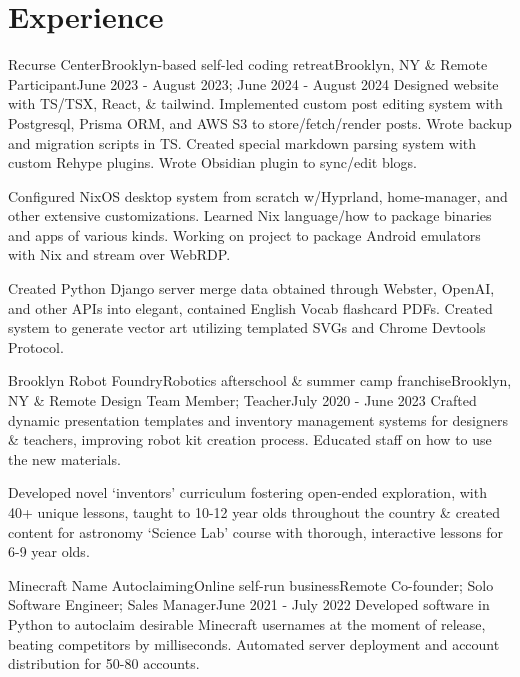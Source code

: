 \documentclass[letterpaper, 10pt]{article}
\begin{document}
\section{Experience}
\resumeSubHeadingListStart

\resumeSubheading
{Recurse Center}{Brooklyn-based self-led coding retreat}{Brooklyn, NY \& Remote}
{Participant}{June 2023 - August 2023; June 2024 - August 2024}{}
\resumeItemListStart
{}
{Designed website with TS/TSX, React, \& tailwind. Implemented custom post editing system with Postgresql, Prisma ORM, and AWS S3 to store/fetch/render posts. Wrote backup and migration scripts in TS. Created special markdown parsing system with custom Rehype plugins. Wrote Obsidian plugin to sync/edit blogs.}

{Configured NixOS desktop system from scratch w/Hyprland, home-manager, and other extensive customizations. Learned Nix language/how to package binaries and apps of various kinds. Working on project to package Android emulators with Nix and stream over WebRDP.}

{Created Python Django server merge data obtained through Webster, OpenAI, and other APIs into elegant, contained English Vocab flashcard PDFs. Created system to generate vector art utilizing templated SVGs and Chrome Devtools Protocol.}
\resumeItemListEnd

\resumeSubheading
{Brooklyn Robot Foundry}{Robotics afterschool \& summer camp franchise}{Brooklyn, NY \& Remote}
{Design Team Member; Teacher}{July 2020 - June 2023}{}
\resumeItemListStart
{}
{Crafted dynamic presentation templates and inventory management systems for designers \& teachers, improving robot kit creation process. Educated staff on how to use the new materials.}

{Developed novel `inventors' curriculum fostering open-ended exploration, with 40+ unique lessons, taught to 10-12 year olds throughout the country \& created content for astronomy `Science Lab' course with thorough, interactive lessons for 6-9 year olds.}

\resumeItemListEnd

\resumeSubheading
{Minecraft Name Autoclaiming}{Online self-run business}{Remote}
{Co-founder; Solo Software Engineer; Sales Manager}{June 2021 - July 2022}{}
\resumeItemListStart
{}
{Developed software in Python to autoclaim desirable Minecraft usernames at the moment of release, beating competitors by milliseconds. Automated server deployment and account distribution for 50-80 accounts.}
\end{document}
